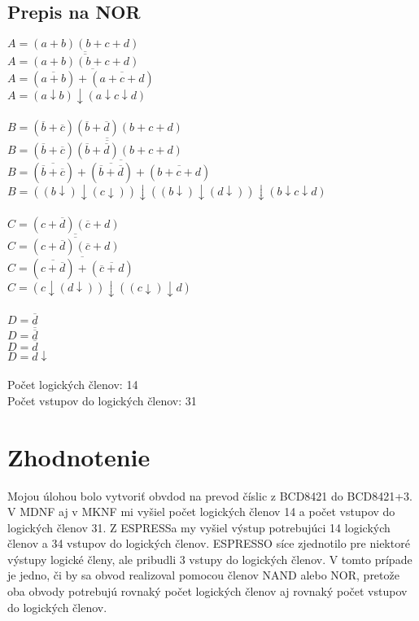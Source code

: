\documentclass{article}
\begin{document}
\subsection{Prepis na NOR}
$A = (a+b)(b+c+d)$\\
$A = \overline{\overline{(a+b)(b+c+d)}}$\\
$A = \overline{(\overline{a+b})+(\overline{a+c+d})}$\\
$A = (a\downarrow b)\downarrow(a\downarrow c\downarrow d)$\\\\
$B = (\overline{b}+\overline{c})(\overline{b}+\overline{d})(b+c+d)$\\
$B = \overline{\overline{(\overline{b}+\overline{c})(\overline{b}+\overline{d})(b+c+d)}}$\\
$B = \overline{(\overline{\overline{b}+\overline{c}})+(\overline{\overline{b}+\overline{d}})+(\overline{b+c+d})}$\\
$B = ((b\downarrow)\downarrow(c\downarrow))\downarrow((b\downarrow)\downarrow(d\downarrow))\downarrow(b\downarrow c\downarrow d)$\\\\
$C = (c+\overline{d})(\overline{c}+d)$\\
$C = \overline{\overline{(c+\overline{d})(\overline{c}+d)}}$\\
$C = \overline{(\overline{c+\overline{d}})+(\overline{\overline{c}+d})}$\\
$C = (c\downarrow(d\downarrow))\downarrow((c\downarrow)\downarrow d)$\\\\
$D = \overline{d}$\\
$D = \overline{\overline{\overline{d}}}$\\
$D = \overline{d}$\\
$D = d\downarrow$\\\\
Počet logických členov: 14\\
Počet vstupov do logických členov: 31

\section{Zhodnotenie}
Mojou úlohou bolo vytvoriť obvdod na prevod číslic z BCD8421 do BCD8421+3. V MDNF aj v MKNF mi vyšiel počet logických členov 14 a počet vstupov do logických členov 31. Z ESPRESSa my vyšiel výstup potrebujúci 14 logických členov a 34 vstupov do logických členov. ESPRESSO síce zjednotilo pre niektoré výstupy logické členy, ale pribudli 3 vstupy do logických členov. V tomto prípade je jedno, či by sa obvod realizoval pomocou členov NAND alebo NOR, pretože oba obvody potrebujú rovnaký počet logických členov aj rovnaký počet vstupov do logických členov.
\end{document}
